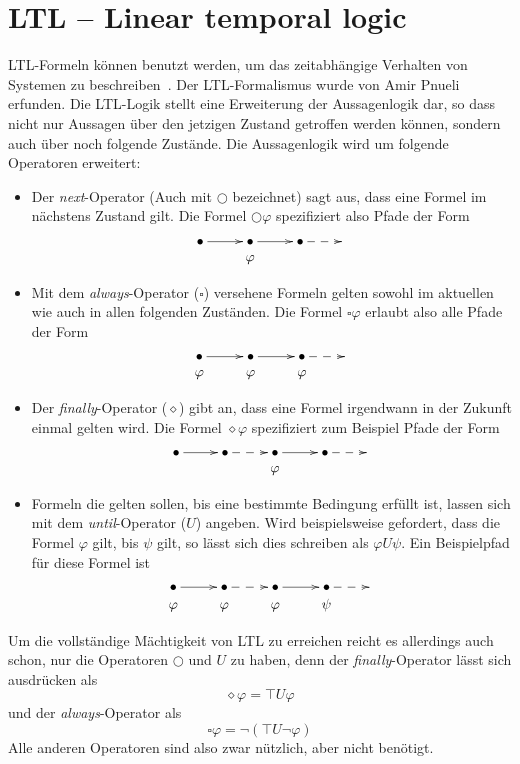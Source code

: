 \section{LTL -- Linear temporal logic}
LTL-Formeln können benutzt werden, um das zeitabhängige Verhalten von Systemen zu beschreiben~\cite{principles_of_model_checking}.
Der LTL-Formalismus wurde von Amir Pnueli~\cite{ltlbasics} erfunden.
Die LTL-Logik stellt eine Erweiterung der Aussagenlogik dar, so dass nicht nur Aussagen über den jetzigen Zustand getroffen werden können, sondern auch über noch folgende Zustände.
Die Aussagenlogik wird um folgende Operatoren erweitert:
\begin{itemize}
\item Der \emph{next}-Operator (Auch mit $\bigcirc$ bezeichnet) sagt aus, dass eine Formel im nächstens Zustand gilt.
  Die Formel $\bigcirc\varphi$ spezifiziert also Pfade der Form
  \[ \xymatrix @R=0em {
      \bullet \ar[r] & \bullet \ar[r] & \bullet \ar@{-->}[r] &\\
      & \varphi & &
  }
    \]
\item Mit dem \emph{always}-Operator ($\square$) versehene Formeln gelten sowohl im aktuellen wie auch in allen folgenden Zuständen.
  Die Formel $\square\varphi$ erlaubt also alle Pfade der Form
  \[ \xymatrix @R=0em {
      \bullet \ar[r] & \bullet \ar[r] & \bullet \ar@{-->}[r] &\\
      \varphi & \varphi & \varphi &
  }
    \]
\item Der \emph{finally}-Operator ($\diamond$) gibt an, dass eine Formel irgendwann in der Zukunft einmal gelten wird.
  Die Formel $\diamond\varphi$ spezifiziert zum Beispiel Pfade der Form
  \[ \xymatrix @R=0em {
    \bullet \ar[r] & \bullet \ar@{-->}[r] & \bullet \ar[r] & \bullet \ar@{-->}[r] & \\
    & & \varphi & &
  } \]
\item Formeln die gelten sollen, bis eine bestimmte Bedingung erfüllt ist, lassen sich mit dem \emph{until}-Operator ($U$) angeben.
  Wird beispielsweise gefordert, dass die Formel $\varphi$ gilt, bis $\psi$ gilt, so lässt sich dies schreiben als $\varphi U\psi$.
  Ein Beispielpfad für diese Formel ist
  \[ \xymatrix @R=0em {
    \bullet \ar[r] & \bullet \ar@{-->}[r] & \bullet \ar[r] & \bullet \ar@{-->}[r] & \\
    \varphi & \varphi & \varphi & \psi &
  } \]
\end{itemize}
Um die vollständige Mächtigkeit von LTL zu erreichen reicht es allerdings auch schon, nur die Operatoren $\bigcirc$ und $U$ zu haben, denn der \emph{finally}-Operator lässt sich ausdrücken als
\[ \diamond\varphi = \top U \varphi \]
und der \emph{always}-Operator als
\[ \square\varphi = \lnot (\top U \lnot\varphi) \]
Alle anderen Operatoren sind also zwar nützlich, aber nicht benötigt.